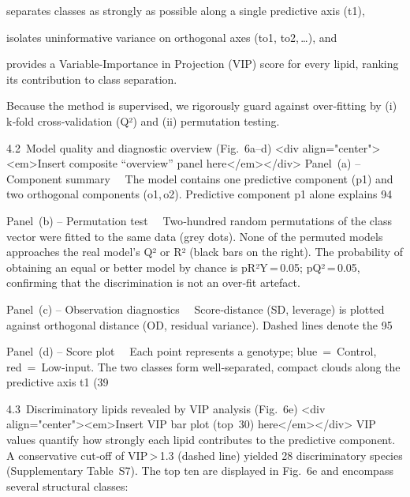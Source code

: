 \documentclass[10pt,letterpaper]{article}
\begin{document}
separates classes as strongly as possible along a single predictive axis (t1),

isolates uninformative variance on orthogonal axes (to1, to2, …), and

provides a Variable‑Importance in Projection (VIP) score for every lipid, ranking its contribution to class separation.

Because the method is supervised, we rigorously guard against over‑fitting by (i) k‑fold cross‑validation (Q²) and (ii) permutation testing.

4.2 Model quality and diagnostic overview (Fig. 6a–d)
<div align="center"><em>Insert composite “overview” panel here</em></div>
Panel (a) – Component summary 
The model contains one predictive component (p1) and two orthogonal components (o1, o2). Predictive component p1 alone explains 94 %

Panel (b) – Permutation test 
Two‑hundred random permutations of the class vector were fitted to the same data (grey dots). None of the permuted models approaches the real model’s Q² or R² (black bars on the right). The probability of obtaining an equal or better model by chance is pR²Y = 0.05; pQ² = 0.05, confirming that the discrimination is not an over‑fit artefact.

Panel (c) – Observation diagnostics 
Score‑distance (SD, leverage) is plotted against orthogonal distance (OD, residual variance). Dashed lines denote the 95 %

Panel (d) – Score plot 
Each point represents a genotype; blue = Control, red = Low‑input. The two classes form well‑separated, compact clouds along the predictive axis t1 (39 %

4.3 Discriminatory lipids revealed by VIP analysis (Fig. 6e)
<div align="center"><em>Insert VIP bar plot (top 30) here</em></div>
VIP values quantify how strongly each lipid contributes to the predictive component. A conservative cut‑off of VIP > 1.3 (dashed line) yielded 28 discriminatory species (Supplementary Table S7). The top ten are displayed in Fig. 6e and encompass several structural classes:
\end{document}
